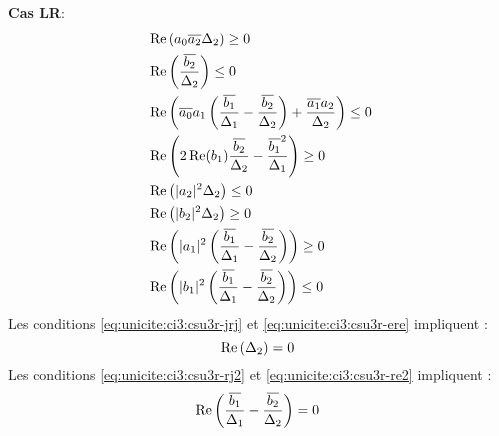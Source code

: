 			\begin{minipage}{0.49\textwidth}
				\textbf{Cas LR}:
				\begin{align}
					\label{eq:unicite:ci3:csu3r-j2}&\Re\left(a_0\conj{a_2}\Delta_2\right) \ge 0 \\
					\label{eq:unicite:ci3:csu3r-e2}&\Re\left(\frac{\conj{b_2}}{\Delta_2}\right) \le 0 \\
					\label{eq:unicite:ci3:csu3r-jdj}&\Re\left(\conj{a_0}a_1\left(\frac{\conj{b_1}}{\Delta_1}-\frac{\conj{b_2}}{\Delta_2}\right) + \frac{\conj{a_1}a_2}{\Delta_2} \right)\le 0\\
					\label{eq:unicite:ci3:csu3r-ede}&\Re\left(2\Re(b_1)\frac{\conj{b_2}}{\Delta_2}-\frac{\conj{b_1}^2}{\Delta_1}\right) \ge 0\\
					\label{eq:unicite:ci3:csu3r-jrj}&\Re\left(|a_2|^2\Delta_2\right) \le 0 \\
					\label{eq:unicite:ci3:csu3r-ere}&\Re\left(|b_2|^2\Delta_2\right) \ge 0 \\
					\label{eq:unicite:ci3:csu3r-rj2}&\Re\left(|a_1|^2\left(\frac{\conj{b_1}}{\Delta_1}-\frac{\conj{b_2}}{\Delta_2}\right)\right)\ge 0\\
					\label{eq:unicite:ci3:csu3r-re2}&\Re\left(|b_1|^2\left(\frac{\conj{b_1}}{\Delta_1}-\frac{\conj{b_2}}{\Delta_2}\right)\right)\le 0
				\end{align}
				Les conditions \eqref{eq:unicite:ci3:csu3r-jrj} et \eqref{eq:unicite:ci3:csu3r-ere} impliquent :
				\begin{equation}
					\Re\left(\Delta_2\right) = 0\\\
				\end{equation}
				Les conditions \eqref{eq:unicite:ci3:csu3r-rj2} et \eqref{eq:unicite:ci3:csu3r-re2} impliquent :
				\begin{equation}
					\Re\left(\frac{\conj{b_1}}{\Delta_1}-\frac{\conj{b_2}}{\Delta_2}\right) = 0\\\
				\end{equation}
			\end{minipage}
